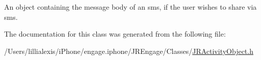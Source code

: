 An object containing the message body of an sms, if the user wishes to share via sms. 

The documentation for this class was generated from the following file:\begin{DoxyCompactItemize}
\item 
/Users/lillialexis/iPhone/engage.iphone/JREngage/Classes/\hyperlink{_j_r_activity_object_8h}{JRActivityObject.h}\end{DoxyCompactItemize}
